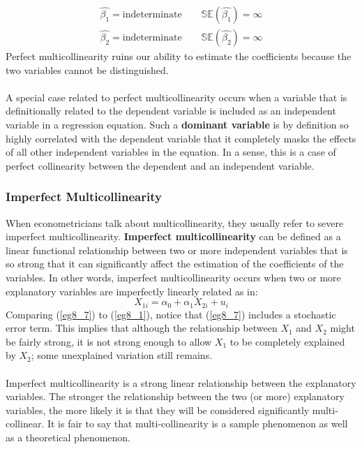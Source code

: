 \documentclass[11pt]{article}
\begin{document}
\begin{align}
\hat{\beta_1} = \text{indeterminate} \quad\quad \mathbb{SE}(\hat{\beta_1}) = \infty \label{eg8_5}\\ 
\hat{\beta_2} = \text{indeterminate} \quad\quad \mathbb{SE}(\hat{\beta_2}) = \infty \label{eg8_6}
\end{align}
Perfect multicollinearity ruins our ability to estimate the coefficients because the two variables cannot be distinguished. \\ \\
A special case related to perfect multicollinearity occurs when a variable that is definitionally related to the dependent variable is included as an independent variable in a regression equation. Such a \textbf{dominant variable} is by definition so highly correlated with the dependent variable that it completely masks the effects of all other independent variables in the equation. In a sense, this is a case of perfect collinearity between the dependent and an independent variable.
\subsubsection{Imperfect Multicollinearity}
When econometricians talk about multicollinearity, they usually refer to severe imperfect multicollinearity. \textbf{Imperfect multicollinearity} can be defined as a linear functional relationship between two or more independent variables that is so strong that it can significantly affect the estimation of the coefficients of the variables. In other words, imperfect multicollinearity occurs when two or more explanatory variables are imperfectly linearly related as in:
\begin{equation}
X_{1i} = \alpha_0 + \alpha_1X_{2i} + u_i \label{eg8_7}
\end{equation}
Comparing (\ref{eg8_7}) to (\ref{eg8_1}), notice that (\ref{eg8_7}) includes a stochastic error term. This implies that although the relationship between $X_1$ and $X_2$ might be fairly strong, it is not strong enough to allow $X_1$ to be completely explained by $X_2$; some unexplained variation still remains. \\ \\
Imperfect multicollinearity is a strong linear relationship between the explanatory variables. The stronger the relationship between the two (or more) explanatory variables, the more likely it is that they will be considered significantly multi-collinear. It is fair to say that multi-collinearity is a sample phenomenon as well as a theoretical phenomenon.
\end{document}
